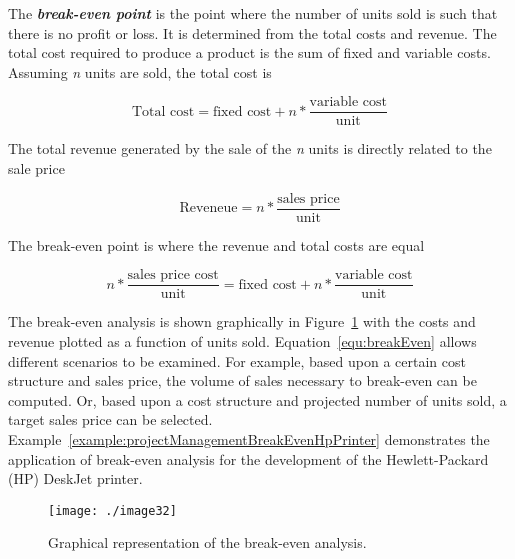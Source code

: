 The \emph{\textbf{break-even point}} is the point where the number of
units sold is such that there is no profit or loss. It is determined
from the total costs and revenue. The total cost required to produce a
product is the sum of fixed and variable costs. Assuming \emph{n} units
are sold, the total cost is

\begin{equation}
\label{equ:totalCost}
\text{Total cost} = \text{fixed cost} + n *\frac{\text{variable cost}}{\text{unit}}
\end{equation}

The total revenue generated by the sale of the \emph{n} units is
directly related to the sale price

\begin{equation}
\label{equ:Revenue}
\text{Reveneue} = n *\frac{\text{sales price}}{\text{unit}}
\end{equation}

The break-even point is where the revenue and total costs are equal

\begin{equation}
\label{equ:breakEven}
n * \frac{\text{sales price cost}}{\text{unit}} = \text{fixed cost} + n * \frac{\text{variable cost}}{\text{unit}}
\end{equation}

The break-even analysis is shown graphically in 
Figure~\ref{figure:breakEvenGraph} with the
costs and revenue plotted as a function of units sold. 
Equation~\ref{equ:breakEven}
allows different scenarios to be examined. For example, based upon a
certain cost structure and sales price, the volume of sales necessary to
break-even can be computed. Or, based upon a cost structure and
projected number of units sold, a target sales price can be selected.
Example~\ref{example:projectManagementBreakEvenHpPrinter} 
demonstrates the application of break-even analysis for the
development of the Hewlett-Packard (HP) DeskJet printer.

\begin{figure}[h]
\centering
\texttt{[image: ./image32]}
\caption{Graphical representation of the break-even
analysis.}
\label{figure:breakEvenGraph}
\end{figure}



